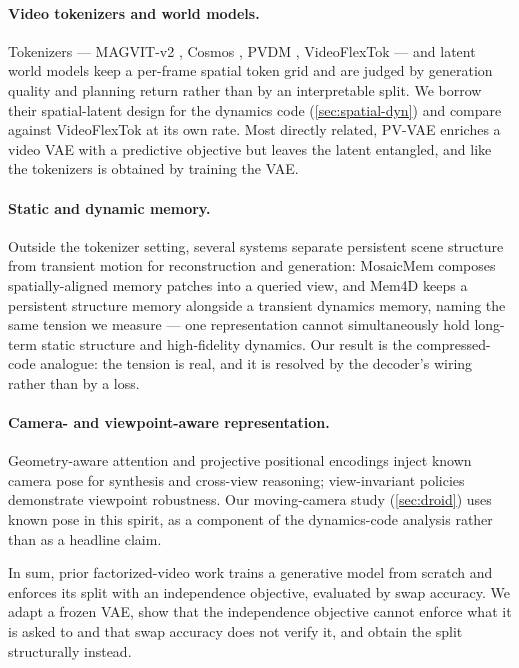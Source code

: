 \paragraph{Video tokenizers and world models.}
Tokenizers --- MAGVIT-v2 \citep{magvitv2}, Cosmos \citep{cosmos}, PVDM \citep{pvdm},
VideoFlexTok \citep{videoflextok} --- and latent world models \citep{dreamerv3,tdmpc2,
ivideogpt,genie} keep a per-frame spatial token grid and are judged by generation
quality and planning return rather than by an interpretable split. We borrow their
spatial-latent design for the dynamics code (\cref{sec:spatial-dyn}) and compare against
VideoFlexTok at its own rate. Most directly related, PV-VAE \citep{pvvae} enriches a
video VAE with a predictive objective but leaves the latent entangled, and like the
tokenizers is obtained by training the VAE.

\paragraph{Static and dynamic memory.}
Outside the tokenizer setting, several systems separate persistent scene structure from
transient motion for reconstruction and generation: MosaicMem \citep{mosaicmem} composes
spatially-aligned memory patches into a queried view, and Mem4D \citep{mem4d} keeps a
persistent structure memory alongside a transient dynamics memory, naming the same
tension we measure --- one representation cannot simultaneously hold long-term static
structure and high-fidelity dynamics. Our result is the compressed-code analogue: the
tension is real, and it is resolved by the decoder's wiring rather than by a loss.

\paragraph{Camera- and viewpoint-aware representation.}
Geometry-aware attention \citep{gta} and projective positional encodings \citep{prope}
inject known camera pose for synthesis and cross-view reasoning; view-invariant policies
\citep{reviwo,vista} demonstrate viewpoint robustness. Our moving-camera study
(\cref{sec:droid}) uses known pose in this spirit, as a component of the dynamics-code
analysis rather than as a headline claim.

In sum, prior factorized-video work trains a generative model from scratch and enforces
its split with an independence objective, evaluated by swap accuracy. We adapt a frozen
VAE, show that the independence objective cannot enforce what it is asked to and that
swap accuracy does not verify it, and obtain the split structurally instead.
